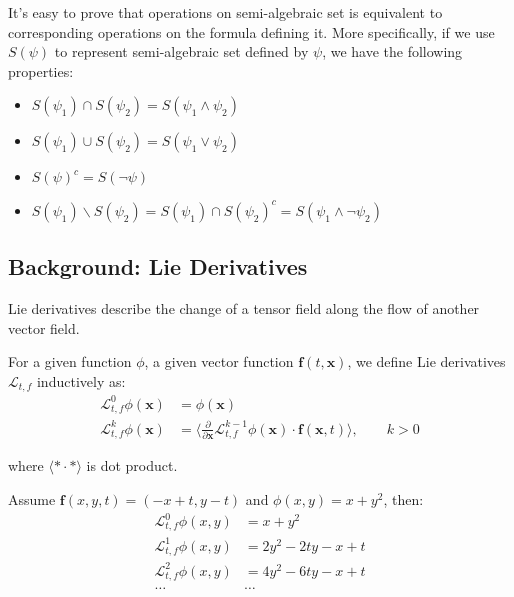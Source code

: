 \documentclass{article}
\begin{document}
It's easy to prove that operations on semi-algebraic set is equivalent to corresponding operations on the formula defining it. More specifically, if we use $S(\psi)$ to represent semi-algebraic set defined by $\psi$, we have the following properties: 
\begin{itemize}
	\item $S(\psi_1) \cap S(\psi_2) = S(\psi_1 \wedge \psi_2)$
	\item $S(\psi_1) \cup S(\psi_2) = S(\psi_1 \vee \psi_2)$
	\item $S(\psi)^c = S(\neg \psi)$
	\item $S(\psi_1) \backslash S(\psi_2) = S(\psi_1) \cap S(\psi_2)^c = S(\psi_1 \wedge \neg \psi_2)$
\end{itemize}

\subsection{Background: Lie Derivatives}
Lie derivatives describe the change of a tensor field along the flow of another vector field. 

\begin{Definition}
\label{def:lieDeri}
For a given function $\phi$, a given vector function $\boldsymbol{f}(t, \boldsymbol{x})$, we define Lie derivatives $\mathcal{L}_{t, f}$ inductively as: 
\begin{align*}
	\mathcal{L}_{t, f}^0 \phi (\boldsymbol{x}) &= \phi (\boldsymbol{x}) \\
	\mathcal{L}_{t, f}^k \phi (\boldsymbol{x}) &= \langle \frac{\partial}{\partial \boldsymbol{x}} \mathcal{L}_{t, f}^{k-1} \phi (\boldsymbol{x}) \cdot  \boldsymbol{f}(\boldsymbol{x}, t) \rangle,\qquad k>0
\end{align*}

where $\langle * \cdot * \rangle$ is dot product.
\end{Definition}

\begin{Example}
	Assume $\boldsymbol{f}(x,y,t) = (-x+t,y-t)$ and $\phi (x,y) = x + y^2$, then: 
	\begin{align*}
		\mathcal{L}_{t, f}^0 \phi (x, y) &= x + y^2 \\
		\mathcal{L}_{t, f}^1 \phi (x, y) &= 2y^2 - 2ty -x + t \\
		\mathcal{L}_{t, f}^2 \phi (x, y) &= 4y^2 - 6ty -x + t \\
		\dots & \dots
	\end{align*}
\end{Example}
\end{document}
